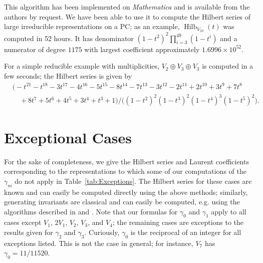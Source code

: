 \documentclass{amsart}
\theoremstyle{definition}
\theoremstyle{remark}
\newcommand{\Hilb}{\operatorname{Hilb}}
\begin{document}
This algorithm has been implemented on \emph{Mathematica} and is available from the authors by request.
We have been able to use it to compute the Hilbert series of large irreducible representations on a PC; as
an example, $\Hilb_{V_{50}}(t)$ was computed in 52 hours. It has denominator
$(1 - t^2)^2\prod_{i=3}^{49}(1 - t^i)$ and a numerator of degree $1175$ with largest coefficient
approximately $1.6996\times 10^{52}$.

For a simple reducible example with multiplicities, $V_2\oplus V_3\oplus V_3$ is computed in a few seconds; the Hilbert
series is given by
\begin{align*}
    &\Big(-t^{21} - t^{18} - 3 t^{17} - 4 t^{16} - 5 t^{15} - 8 t^{14} - 7 t^{13}
        - 3 t^{12} - 2 t^{11} + 2 t^{10} + 3 t^9 + 7 t^8
    \\ &\quad
        + 8 t^7 + 5 t^6 + 4 t^5 + 3 t^4 + t^3 + 1\Big)
    /\Big((1-t^2)^2(1-t^3)^2(1-t^4)^3(1-t^5)^2\Big)  .
\end{align*}


\appendix

\section{Exceptional Cases}
\label{ap:Exceptions}

For the sake of completeness, we give the Hilbert series and Laurent coefficients corresponding to the
representations to which some of our computations of the $\gamma_m$ do not apply
in Table~\ref{tab:Exceptions}.
The Hilbert series for these cases are known and can easily be computed directly using the above
methods; similarly, generating invariants are classical and can easily be computed, e.g. using the
algorithms described in \cite{BedratyukSL2Invariants} and \cite[Sections 4.1--2]{DerskenKemperBook}.
Note that our formulas for $\gamma_0$ and $\gamma_1$ apply to all cases except
$V_1$, $2V_1$, $V_2$, $V_3$, and $V_4$; the remaining cases are exceptions to the results given for
$\gamma_2$ and $\gamma_3$. Curiously, $\gamma_0$ is the reciprocal of an integer for all exceptions
listed. This is not the case in general; for instance, $V_7$ has $\gamma_0 = 11/11520$.
\end{document}
